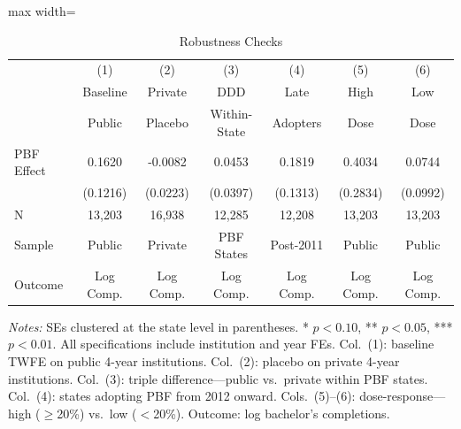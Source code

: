 \begin{table}[H]
\centering
\caption{Robustness Checks}
\label{tab:robust}
\begin{adjustbox}{max width=\textwidth}
\begin{threeparttable}
\begin{tabular}{lcccccc}
\toprule
 & (1) & (2) & (3) & (4) & (5) & (6) \\
 & Baseline & Private & DDD & Late & High & Low \\
 & Public & Placebo & Within-State & Adopters & Dose & Dose \\
\midrule
PBF Effect & 0.1620 & -0.0082 & 0.0453 & 0.1819 & 0.4034 & 0.0744 \\
  & (0.1216) & (0.0223) & (0.0397) & (0.1313) & (0.2834) & (0.0992) \\
\addlinespace
N & 13,203 & 16,938 & 12,285 & 12,208 & 13,203 & 13,203 \\
Sample & Public & Private & PBF States & Post-2011 & Public & Public \\
Outcome & Log Comp. & Log Comp. & Log Comp. & Log Comp. & Log Comp. & Log Comp. \\
\bottomrule
\end{tabular}
\begin{tablenotes}[flushleft]
\footnotesize
\item \textit{Notes:} SEs clustered at the state level in parentheses. * $p<0.10$, ** $p<0.05$, *** $p<0.01$. All specifications include institution and year FEs. Col.\ (1): baseline TWFE on public 4-year institutions. Col.\ (2): placebo on private 4-year institutions. Col.\ (3): triple difference---public vs.\ private within PBF states. Col.\ (4): states adopting PBF from 2012 onward. Cols.\ (5)--(6): dose-response---high ($\geq$20\%) vs.\ low ($<$20\%). Outcome: log bachelor's completions.
\end{tablenotes}
\end{threeparttable}
\end{adjustbox}
\end{table}
